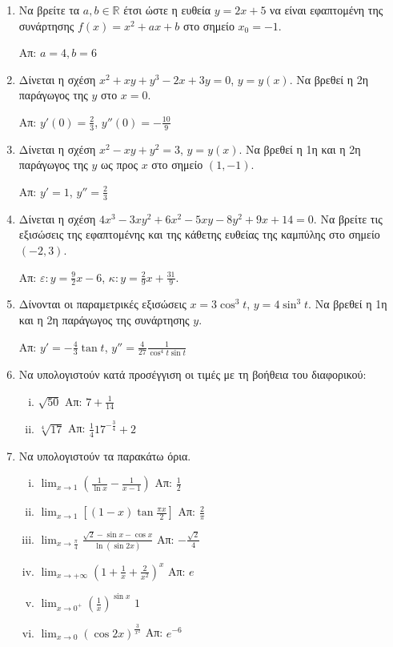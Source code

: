 \begin{enumerate}
	\item Να βρείτε τα $ a, b \in \mathbb{R} $ έτσι ώστε η ευθεία $ y = 2x + 5
		$ να είναι εφαπτομένη της συνάρτησης $ f(x) = x^{2} + ax + b $ στο
		σημείο $ x_{0} = -1 $. 

		\hfill Απ: $ a = 4, b = 6 $

	\item Δίνεται η σχέση $ x^{2} + xy + y^{3} -2x + 3y = 0 $, $ y=y(x) $. Να βρεθεί η
		2η παράγωγος της $y$ στο $ x=0 $. 
		
		\hfill Απ: $ y'(0) = \frac{2}{3} $, $ y''(0) = -\frac{10}{9} $ 

	\item Δίνεται η σχέση $ x^{2} - xy + y^{2} = 3 $, $ y=y(x) $. Να βρεθεί η 1η
		και η 2η παράγωγος της $y$ ως προς $x$ στο σημείο $ (1,-1) $.

		\hfill Απ: $ y' = 1$, $ y'' = \frac{2}{3} $

	\item Δίνεται η σχέση $ 4x^{3} - 3xy^{2} + 6x^{2} - 5xy - 8 y^{2} + 9x + 14
		= 0$. Να βρείτε τις εξισώσεις της εφαπτομένης και της κάθετης ευθείας
		της καμπύλης στο σημείο $ (-2,3) $.

		\hfill Απ: $\varepsilon\colon y = \frac{9}{2} x - 6 $, $\kappa\colon y = \frac{2}{9} x +
		\frac{31}{9} $.

	\item Δίνονται οι παραμετρικές εξισώσεις $ x = 3 \cos^{3}{t} $, $ y = 4
		\sin^{3}{t}	$. Να βρεθεί η 1η και η 2η παράγωγος της συνάρτησης $y$.

		\hfill Απ: $ y' = -\frac{4}{3} \tan{t} $, $ y'' = \frac{4}{27}
		\frac{1}{\cos^{4}t \sin{t}} $ 

	\item Να υπολογιστούν κατά προσέγγιση οι τιμές με τη βοήθεια του διαφορικού:
		\begin{enumerate}[i)]
			\item $\sqrt{50}$ \hfill Απ: $7+\frac{1}{14}$
			\item $\sqrt[4]{17}$ \hfill Απ: $\frac{1}{4}17^{-\frac{3}{4}}+2$
		\end{enumerate}

	\item Να υπολογιστούν τα παρακάτω όρια.
		\begin{enumerate}[(i)]
			\item $ \lim_{x\to 1} \left(\frac{1}{\ln{x}} - \frac{1}{x-1}\right) $ \hfill
				Απ: $ \frac{1}{2} $
			\item $ \lim_{x\to 1} \left[(1-x) \tan{\frac{\pi x}{2}}\right] $ \hfill Απ: $
				\frac{2}{\pi} $
			\item $ \lim_{x\to \frac{\pi}{4}} \frac{\sqrt{2} - \sin{x} -
				\cos{x}}{\ln{(\sin{2x})}} $ \hfill Απ: $ - \frac{\sqrt{2}}{4} $
			\item $ \lim_{x\to +\infty} \left(1 + \frac{1}{x} +
				\frac{2}{x^{2}}\right)^{x} $ \hfill Απ: $ e $ 
			\item $ \lim_{x\to 0^{+}} \left(\frac{1}{x}\right)^{\sin{x}} $ \hfill $ 1 $
			\item $ \lim_{x\to 0} \left(\cos{2x}\right)^{\frac{3}{x^{2}}}  $ \hfill Απ:
				$ e^{-6} $
		\end{enumerate}


\end{enumerate}

